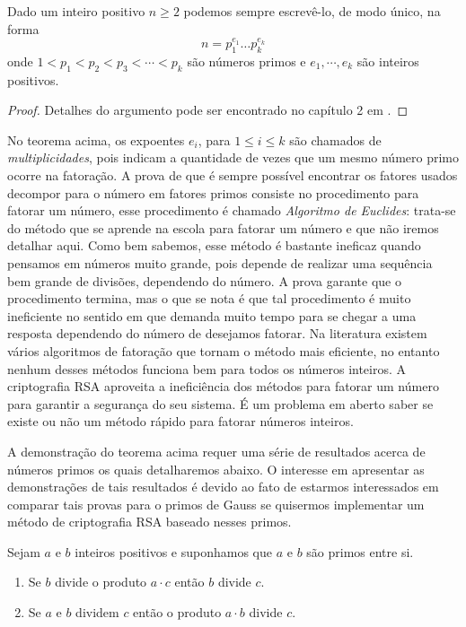 \begin{Th}
\label{fat.unica} 
Dado um inteiro positivo $n\geq 2$ podemos sempre escrev\^e-lo, de modo \'unico, na forma
$$n=p_{1}^{e_1}\dots p_{k}^{e_k}$$
onde $1<p_1<p_2<p_3<\cdots<p_k$ s\~ao n\'umeros primos e $e_1, \cdots, e_k$ s\~ao inteiros positivos.
\end{Th}
\begin{proof}
	Detalhes do argumento pode ser encontrado no capítulo 2 em \cite{cou:2014}.
\end{proof}

No teorema acima, os expoentes $e_i$, para $1\leq i\leq k$ s\~ao chamados de \textit{multiplicidades}, pois indicam a quantidade de vezes que um mesmo n\'umero primo ocorre na fatora\c{c}\~ao. A prova de que \'e sempre poss\'ivel encontrar os fatores usados decompor para o n\'umero em fatores primos consiste no procedimento para fatorar um n\'umero, esse procedimento \'e chamado \textit{Algoritmo de Euclides}: trata-se do m\'etodo que se aprende na escola para fatorar
um n\'umero e que n\~ao iremos detalhar aqui. Como bem sabemos, esse m\'etodo \'e bastante ineficaz quando pensamos em n\'umeros muito grande, pois depende de realizar uma sequ\^encia bem grande de divis\~oes, dependendo do n\'umero. A prova garante que o procedimento termina, mas o que se nota \'e que tal procedimento \'e muito ineficiente no sentido em que demanda muito tempo para se chegar a uma resposta dependendo do n\'umero de desejamos fatorar. Na literatura existem v\'arios algoritmos de fatora\c{c}\~ao que tornam o m\'etodo mais eficiente, no entanto nenhum desses m\'etodos funciona bem para todos os n\'umeros inteiros. A criptografia RSA aproveita a inefici\^encia dos m\'etodos para fatorar um n\'umero para garantir a seguran\c{c}a do seu sistema. \'E um problema em aberto saber se existe ou n\~ao um m\'etodo r\'apido para fatorar n\'umeros inteiros.  

A demonstra\c{c}\~ao do teorema acima requer uma s\'erie de resultados acerca de n\'umeros primos os quais detalharemos abaixo. O interesse em apresentar as demonstra\c{c}\~oes de tais resultados \'e devido ao fato de estarmos interessados em comparar tais provas para o primos de Gauss se quisermos implementar um m\'etodo de criptografia RSA baseado nesses primos. 

\begin{Th}\label{propriedade_de_primos}
Sejam $a$ e $b$ inteiros positivos e suponhamos que $a$ e $b$ s\~ao primos entre si.
\begin{enumerate}
\item Se $b$ divide o produto $a\cdot c$ ent\~ao $b$ divide $c$.
\item Se $a$ e $b$ dividem $c$ ent\~ao o produto $a\cdot b$ divide $c$.
\end{enumerate}
\end{Th}

